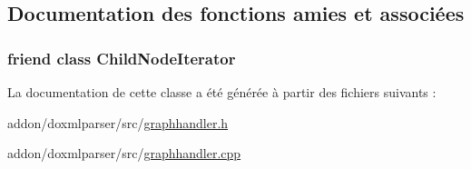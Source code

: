 \subsection{Documentation des fonctions amies et associées}
\hypertarget{class_node_handler_a667d8ca5ea4d4cddbf115f89fb093c21}{}
\subsubsection[{Child\+Node\+Iterator}]{\setlength{\rightskip}{0pt plus 5cm}friend class {\bf Child\+Node\+Iterator}\hspace{0.3cm}{\ttfamily [friend]}}\label{class_node_handler_a667d8ca5ea4d4cddbf115f89fb093c21}


La documentation de cette classe a été générée à partir des fichiers suivants \+:\begin{DoxyCompactItemize}
\item 
addon/doxmlparser/src/\hyperlink{graphhandler_8h}{graphhandler.\+h}\item 
addon/doxmlparser/src/\hyperlink{graphhandler_8cpp}{graphhandler.\+cpp}\end{DoxyCompactItemize}
